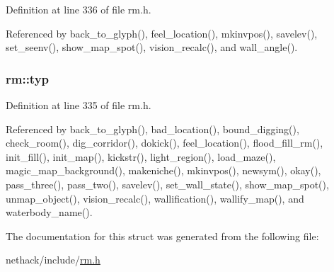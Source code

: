 Definition at line 336 of file rm.\+h.



Referenced by back\+\_\+to\+\_\+glyph(), feel\+\_\+location(), mkinvpos(), savelev(), set\+\_\+seenv(), show\+\_\+map\+\_\+spot(), vision\+\_\+recalc(), and wall\+\_\+angle().

\hypertarget{structrm_aa144ade377ba175f037c4e637329d4dc}{
\subsubsection[{typ}]{ rm\+::typ}}\label{structrm_aa144ade377ba175f037c4e637329d4dc}


Definition at line 335 of file rm.\+h.



Referenced by back\+\_\+to\+\_\+glyph(), bad\+\_\+location(), bound\+\_\+digging(), check\+\_\+room(), dig\+\_\+corridor(), dokick(), feel\+\_\+location(), flood\+\_\+fill\+\_\+rm(), init\+\_\+fill(), init\+\_\+map(), kickstr(), light\+\_\+region(), load\+\_\+maze(), magic\+\_\+map\+\_\+background(), makeniche(), mkinvpos(), newsym(), okay(), pass\+\_\+three(), pass\+\_\+two(), savelev(), set\+\_\+wall\+\_\+state(), show\+\_\+map\+\_\+spot(), unmap\+\_\+object(), vision\+\_\+recalc(), wallification(), wallify\+\_\+map(), and waterbody\+\_\+name().



The documentation for this struct was generated from the following file\+:\begin{DoxyCompactItemize}
\item 
nethack/include/\hyperlink{rm_8h}{rm.\+h}\end{DoxyCompactItemize}
